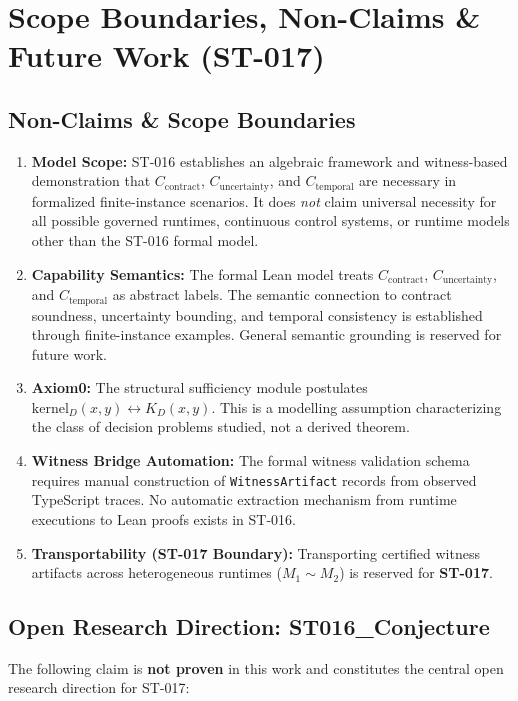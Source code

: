 \section{Scope Boundaries, Non-Claims \& Future Work (ST-017)}
\label{sec:limitations}

\subsection{Non-Claims \& Scope Boundaries}
\begin{enumerate}
    \item \textbf{Model Scope:} ST-016 establishes an algebraic framework and
    witness-based demonstration that $C_{\text{contract}}$, $C_{\text{uncertainty}}$,
    and $C_{\text{temporal}}$ are necessary in formalized finite-instance scenarios.
    It does \emph{not} claim universal necessity for all possible governed runtimes,
    continuous control systems, or runtime models other than the ST-016 formal model.

    \item \textbf{Capability Semantics:} The formal Lean model treats
    $C_{\text{contract}}$, $C_{\text{uncertainty}}$, and $C_{\text{temporal}}$
    as abstract labels. The semantic connection to contract soundness, uncertainty
    bounding, and temporal consistency is established through finite-instance
    examples. General semantic grounding is reserved for future work.

    \item \textbf{Axiom0:} The structural sufficiency module postulates
    $\text{kernel}_D(x,y) \leftrightarrow K_D(x,y)$. This is a modelling
    assumption characterizing the class of decision problems studied, not a
    derived theorem.

    \item \textbf{Witness Bridge Automation:} The formal witness validation schema
    requires manual construction of \texttt{WitnessArtifact} records from
    observed TypeScript traces. No automatic extraction mechanism from runtime
    executions to Lean proofs exists in ST-016.

    \item \textbf{Transportability (ST-017 Boundary):} Transporting certified
    witness artifacts across heterogeneous runtimes ($M_1 \sim M_2$) is reserved
    for \textbf{ST-017}.
\end{enumerate}

\subsection{Open Research Direction: ST016\_Conjecture}
The following claim is \textbf{not proven} in this work and constitutes the
central open research direction for ST-017:

